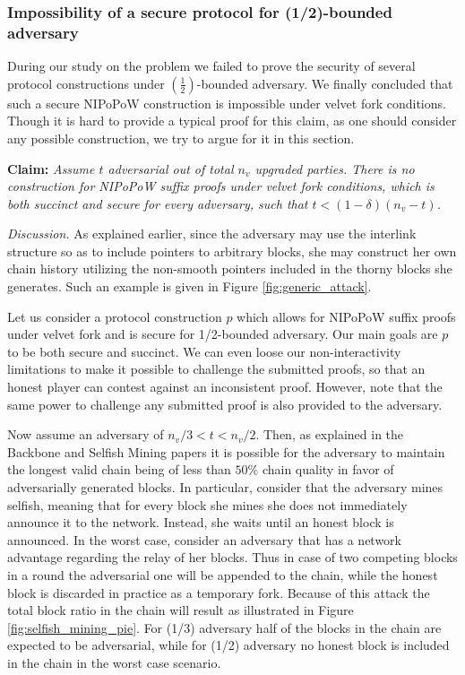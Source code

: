\subsubsection{Impossibility of a secure protocol for (1/2)-bounded adversary}
During our study on the problem we failed to prove the security of several protocol
constructions under $(\frac{1}{2})$-bounded adversary. We finally concluded that
such a secure NIPoPoW construction is impossible under velvet fork conditions.
Though it is hard to provide a typical proof for this claim, as one should consider
any possible construction, we try to argue for it in this section.

\textbf{Claim:} \textit{Assume $t$ adversarial out of total $n_v$ upgraded parties.
There is no construction for NIPoPoW suffix proofs under velvet fork conditions,
which is both succinct and secure for every adversary, such that
$t < (1 - \delta)(n_v - t)$.}

\textit{Discussion.} As explained earlier, since the adversary may use the interlink
structure so as to include pointers to arbitrary blocks,  she may construct her own
chain history utilizing the non-smooth pointers included in the thorny blocks she
generates. Such an example is given in Figure \ref{fig:generic_attack}.

Let us consider a protocol construction $p$ which allows for NIPoPoW suffix proofs
under velvet fork and is secure for 1/2-bounded adversary. Our main
goals are $p$ to be both secure and succinct. We can even loose our non-interactivity
limitations to make it possible to challenge the submitted proofs, so that an honest
player can contest against an inconsistent proof. However, note that the same power
to challenge any submitted proof is also provided to the adversary.

Now assume an adversary of $ n_v/3 < t < n_v/2 $. Then, as explained
in the Backbone and Selfish Mining papers \cite{Backbone}\cite{selfish_mining} it
is possible for the adversary to maintain the longest valid chain being of less
than $50\%$ chain quality in favor of adversarially generated blocks. In particular,
consider that the adversary mines selfish, meaning that for every block she mines
she does not immediately announce it to the network. Instead, she waits until an
honest block is announced. In the worst case, consider an adversary that has a
network advantage regarding the relay of her blocks. Thus in case of two competing
blocks in a round the adversarial one will be appended to the chain, while the
honest block is discarded in practice as a temporary fork. Because of this attack
the total block ratio in the chain will result as illustrated in Figure
\ref{fig:selfish_mining_pie}. For (1/3) adversary half of the blocks in the
chain are expected to be adversarial, while for (1/2) adversary no honest block
is included in the chain in the worst case scenario.

